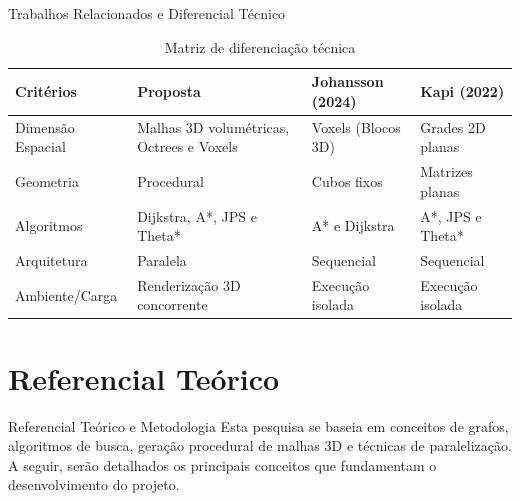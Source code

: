 \documentclass[11pt]{beamer}
\begin{document}
\begin{frame}{Trabalhos Relacionados e Diferencial Técnico}
    \begin{table}[h]\centering
        \caption{Matriz de diferenciação técnica}\label{tab:relacionados}
        \scriptsize
        \begin{tabular}{L{2.2cm} L{2.8cm} L{2.8cm} L{2.8cm}}\toprule
        \textbf{Critérios} & \textbf{Proposta} & \textbf{Johansson (2024)\cite{johansson2024adapting}} & \textbf{Kapi (2022)\cite{Kapi2022}} \\\midrule
        Dimensão Espacial & Malhas 3D volumétricas, Octrees e Voxels & Voxels (Blocos 3D)  & Grades 2D planas \\
        \vspace{0.5em}Geometria & \vspace{0.5em}Procedural & \vspace{0.5em}Cubos fixos & \vspace{0.5em}Matrizes planas \\
        \vspace{0.5em}Algoritmos & \vspace{0.5em}Dijkstra, A*, JPS e Theta* & \vspace{0.5em}A* e Dijkstra & \vspace{0.5em}A*, JPS e Theta* \\
        \vspace{0.5em}Arquitetura & \vspace{0.5em}Paralela & \vspace{0.5em}Sequencial & \vspace{0.5em}Sequencial \\
        \vspace{0.5em}Ambiente/Carga & \vspace{0.5em}Renderização 3D concorrente & \vspace{0.5em}Execução isolada & \vspace{0.5em}Execução isolada \\
        \bottomrule
        \end{tabular}
    \end{table}
\end{frame}

\section{Referencial Teórico}

\begin{frame}{Referencial Teórico e Metodologia}
    Esta pesquisa se baseia em conceitos de grafos, algoritmos de busca, geração procedural de malhas 3D e técnicas de paralelização. A seguir, serão detalhados os principais conceitos que fundamentam o desenvolvimento do projeto.
\end{frame}
\end{document}
